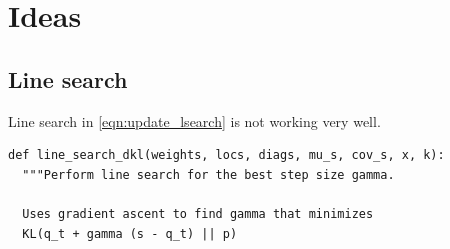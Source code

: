 \section{Ideas}
\subsection{Line search}
Line search in \ref{eqn:update_lsearch} is not working very well. 

\begin{verbatim}
def line_search_dkl(weights, locs, diags, mu_s, cov_s, x, k):
  """Perform line search for the best step size gamma.

  Uses gradient ascent to find gamma that minimizes
  KL(q_t + gamma (s - q_t) || p)


\end{verbatim}
